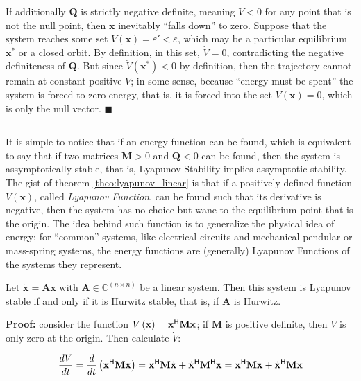 	If additionally $\mathbf{Q}$ is strictly negative definite, meaning $\dot{V} < 0$ for any point that is not the null point, then $\mathbf{x}$ inevitably ``falls down'' to zero. Suppose that the system reaches some set $V\left(\mathbf{x}\right) = \varepsilon' < \varepsilon$, which may be a particular equilibrium $\mathbf{x}^*$ or a closed orbit. By definition, in this set, $\dot{V} = 0$, contradicting the negative definiteness of $\mathbf{Q}$. But since $\dot{V}\left(\mathbf{x}^*\right) < 0$ by definition, then the trajectory cannot remain at constant positive $V$; in some sense, because ``energy must be spent'' the system is forced to zero energy, that is, it is forced into the set $V\left(\mathbf{x}\right) = 0$, which is only the null vector.
\hfill$\blacksquare$
\vspace{5mm}
\hrule
\vspace{5mm} %

	It is simple to notice that if an energy function can be found, which is equivalent to say that if two matrices $\mathbf{M} > 0$ and $\mathbf{Q} < 0$ can be found, then the system is assymptotically stable, that is, Lyapunov Stability implies assymptotic stability. The gist of theorem \ref{theo:lyapunov_linear} is that if a positively defined function $V\left(\mathbf{x}\right)$, called \textit{Lyapunov Function}, can be found such that its derivative is negative, then the system has no choice but wane to the equilibrium point that is the origin. The idea behind such function is to generalize the physical idea of energy; for ``common'' systems, like electrical circuits and mechanical pendular or mass-spring systems, the energy functions are (generally) Lyapunov Functions of the systems they represent.

\begin{theorem} \label{theo:lyapunov_linear} %
	Let $\dot{\mathbf{x}} = \mathbf{Ax}$ with $\mathbf{A}\in\mathbb{C}^{(n\times n)}$ be a linear system. Then this system is Lyapunov stable if and only if it is Hurwitz stable, that is, if $\mathbf{A}$ is Hurwitz.
\end{theorem}
\textbf{Proof:} consider the function $V\left(\mathbf{x}\right) = \mathbf{x}^{\mathsf{H}}\mathbf{M}\mathbf{x}$; if $\mathbf{M}$ is positive definite, then $V$ is only zero at the origin. Then calculate $\dot{V}$:

\begin{equation} \dfrac{dV}{dt} = \dfrac{d}{dt} \left(\mathbf{x}^{\mathsf{H}}\mathbf{M}\mathbf{x}\right) = \mathbf{x}^{\mathsf{H}} \mathbf{M} \dot{\mathbf{x}} + \dot{\mathbf{x}}^{\mathsf{H}}\mathbf{M}^{\mathsf{H}} \mathbf{x} =\mathbf{x}^{\mathsf{H}} \mathbf{M} \dot{\mathbf{x}} + \dot{\mathbf{x}}^{\mathsf{H}}\mathbf{M} \mathbf{x} \end{equation}

